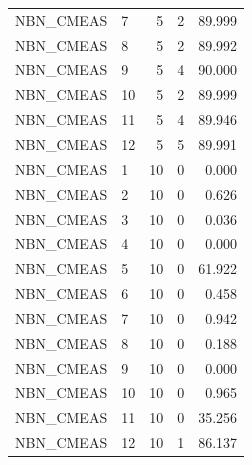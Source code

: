 \begin{longtable}{llrrr}
NBN\_CMEAS & 7 & 5 & 2 & 89.999 \\
NBN\_CMEAS & 8 & 5 & 2 & 89.992 \\
NBN\_CMEAS & 9 & 5 & 4 & 90.000 \\
NBN\_CMEAS & 10 & 5 & 2 & 89.999 \\
NBN\_CMEAS & 11 & 5 & 4 & 89.946 \\
NBN\_CMEAS & 12 & 5 & 5 & 89.991 \\
NBN\_CMEAS & 1 & 10 & 0 & 0.000 \\
NBN\_CMEAS & 2 & 10 & 0 & 0.626 \\
NBN\_CMEAS & 3 & 10 & 0 & 0.036 \\
NBN\_CMEAS & 4 & 10 & 0 & 0.000 \\
NBN\_CMEAS & 5 & 10 & 0 & 61.922 \\
NBN\_CMEAS & 6 & 10 & 0 & 0.458 \\
NBN\_CMEAS & 7 & 10 & 0 & 0.942 \\
NBN\_CMEAS & 8 & 10 & 0 & 0.188 \\
NBN\_CMEAS & 9 & 10 & 0 & 0.000 \\
NBN\_CMEAS & 10 & 10 & 0 & 0.965 \\
NBN\_CMEAS & 11 & 10 & 0 & 35.256 \\
NBN\_CMEAS & 12 & 10 & 1 & 86.137 \\
\bottomrule
\end{longtable}
